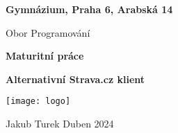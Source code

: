 \begin{titlepage}
\begin{center}
    \vspace{2,5cm}
    \textbf{\Large Gymnázium, Praha 6, Arabská 14}\par
    \Large Obor Programování\par
    \vspace{2cm}
    \textbf{\Huge Maturitní práce}\par
    \vspace{2cm}
    \textbf{\Huge Alternativní Strava.cz klient}\par
    \vspace{2cm}
    \texttt{[image: logo]}\par
    \vfill
   \Large Jakub Turek \hfill Duben 2024
   
    
     
\end{center}
\end{titlepage}